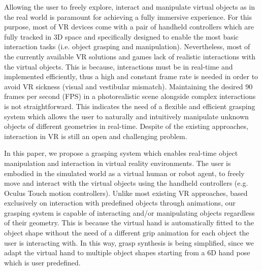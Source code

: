 Allowing the user to freely explore, interact and manipulate virtual objects as in the real world is paramount for achieving a fully immersive experience. For this purpose, most of VR devices come with a pair of handheld controllers which are fully tracked in 3D space and specifically designed to enable the most basic interaction tasks (i.e. object grasping and manipulation). Nevertheless, most of the currently available VR solutions and games lack of realistic interactions with the virtual objects. This is because, interactions must be in real-time and implemented efficiently, thus a high and constant frame rate is needed in order to avoid VR sickness (visual and vestibular mismatch). Maintaining the desired 90 frames per second (FPS) in a photorealistic scene alongside complex interactions is not straightforward. This indicates the need of a flexible and efficient grasping system which allows the user to naturally and intuitively manipulate unknown objects of different geometries in real-time. Despite of the existing approaches, interaction in VR is still an open and challenging problem.

In this paper, we propose a grasping system which enables real-time object manipulation and interaction in virtual reality environments. The user is embodied in the simulated world as a virtual human or robot agent, to freely move and interact with the virtual objects using the handheld controllers (e.g. Oculus Touch motion controllers). Unlike most existing VR approaches, based exclusively on interaction with predefined objects through animations, our grasping system is capable of interacting and/or manipulating objects regardless of their geometry. This is because the virtual hand is automatically fitted to the object shape without the need of a different grip animation for each object the user is interacting with. In this way, grasp synthesis is being simplified, since we adapt the virtual hand to multiple object shapes starting from a 6D hand pose which is user predefined. 

